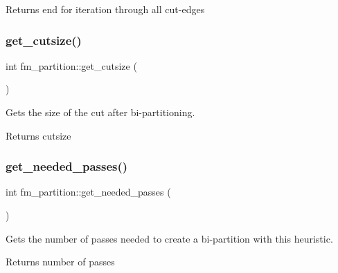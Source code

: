 \begin{DoxyReturn}{Returns}
end for iteration through all cut-\/edges 
\end{DoxyReturn}
\mbox{\label{classfm__partition_a42fa2e19fb3fde093a1a05d0bd6d8ad1}} 
\subsubsection{\texorpdfstring{get\+\_\+cutsize()}{get\_cutsize()}}
{\footnotesize\ttfamily int fm\+\_\+partition\+::get\+\_\+cutsize (\begin{DoxyParamCaption}{ }\end{DoxyParamCaption})}

Gets the size of the cut after bi-\/partitioning.

\begin{DoxyReturn}{Returns}
cutsize 
\end{DoxyReturn}
\mbox{\label{classfm__partition_aa8aa84286a6939d17175fbf646ba3176}} 
\subsubsection{\texorpdfstring{get\+\_\+needed\+\_\+passes()}{get\_needed\_passes()}}
{\footnotesize\ttfamily int fm\+\_\+partition\+::get\+\_\+needed\+\_\+passes (\begin{DoxyParamCaption}{ }\end{DoxyParamCaption})}

Gets the number of passes needed to create a bi-\/partition with this heuristic.

\begin{DoxyReturn}{Returns}
number of passes 
\end{DoxyReturn}
\mbox{\label{classfm__partition_af5f6ad817fe30760f3bc5470bd70c4c9}} 

